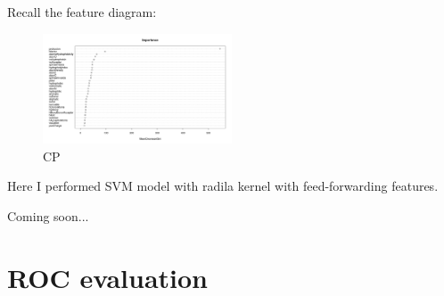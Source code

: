 \documentclass[%
 aip,
 jmp,%
 amsmath,amssymb,
 reprint,%
]{revtex4-1}
\begin{document}
Recall the feature diagram:

\begin{figure}[h]
	\centering

	\includegraphics[width=0.5\textwidth]{graphics/importance.png}

	\caption{CP}
\end{figure}

Here I performed SVM model with radila kernel with feed-forwarding features.

Coming soon...


\newpage

\section{ROC evaluation}
\end{document}
